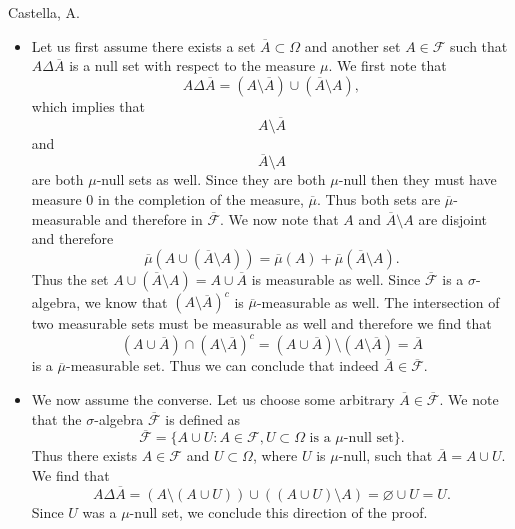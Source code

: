 \begin{solution}[4.7]{Castella, A.}
    \begin{itemize}
        \item Let us first assume there exists a set $\overline{A} \subset \Omega$ and another set $A \in \mathcal{F}$ such that $A\Delta\overline{A}$ is a null set with respect to the measure $\mu$. We first note that 
        $$
            A \Delta \overline{A} = (A\setminus\overline{A}) \cup (\overline{A}\setminus A),
        $$
        which implies that
        $$
            A \setminus \overline{A}
        $$
        and
        $$
            \overline{A} \setminus A
        $$
        are both $\mu$-null sets as well. Since they are both $\mu$-null then they must have measure 0 in the completion of the measure, $\overline{\mu}$. Thus both sets are $\overline{\mu}$-measurable and therefore in $\overline{\mathcal{F}}$. We now note that $A$ and $\overline{A}\setminus A$ are disjoint and therefore
        $$
            \overline{\mu}(A \cup (\overline{A}\setminus A)) = \overline{\mu}(A) + \overline{\mu}(\overline{A}\setminus A).
        $$
        Thus the set $A \cup (\overline{A}\setminus A) = A \cup \overline{A}$ is measurable as well. Since $\overline{\mathcal{F}}$ is a $\sigma$-algebra, we know that $(A\setminus\overline{A})^c$ is $\overline{\mu}$-measurable as well. The intersection of two measurable sets must be measurable as well and therefore we find that
        $$
            (A \cup \overline{A})\cap (A\setminus\overline{A})^c = (A\cup\overline{A})\setminus(A\setminus\overline{A}) = \overline{A}
        $$
        is a $\overline{\mu}$-measurable set. Thus we can conclude that indeed $\overline{A} \in \overline{\mathcal{F}}$.
        \item We now assume the converse. Let us choose some arbitrary $\overline{A} \in \overline{\mathcal{F}}$. We note that the $\sigma$-algebra $\overline{\mathcal{F}}$ is defined as
        $$
            \overline{\mathcal{F}} = \{A \cup U : A \in \mathcal{F}, U\subset\Omega\text{ is a }\mu\text{-null set}\}.
        $$
        Thus there exists $A \in \mathcal{F}$ and $U \subset \Omega$, where $U$ is $\mu$-null, such that $\overline{A} = A\cup U$. We find that
        $$
            A\Delta\overline{A} = (A\setminus(A\cup U))\cup((A\cup U)\setminus A) = \varnothing\cup U = U.
        $$
        Since $U$ was a $\mu$-null set, we conclude this direction of the proof.
    \end{itemize}
\end{solution}

